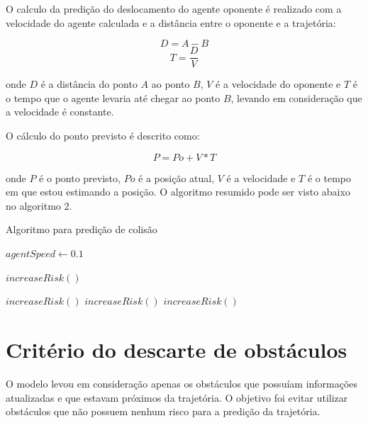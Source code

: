 O calculo da predição do deslocamento do agente oponente é realizado com a velocidade do agente calculada e a distância entre o 
oponente e a trajetória:

\begin{equation}
D = A - B 
\end{equation}
\begin{equation}
T = \frac {D} {V}
\end{equation}

onde $D$ é a distância do ponto $A$ ao ponto $B$, $V$ é a velocidade do oponente e $T$ é o tempo que o agente
levaria até chegar ao ponto $B$, levando em consideração que a velocidade é constante.

O cálculo do ponto previsto é descrito como:

\begin{equation}
  P = Po + V * T 
\end{equation}

onde $P$ é o ponto previsto, $Po$ é a posição atual, $V$ é a velocidade e $T$ é o tempo em que estou estimando a posição. O 
algoritmo resumido pode ser visto abaixo no algoritmo 2.

\begin{algorithm}[!htb]
\label{alg:prediction}
\caption{Algoritmo para predição de colisão}
\begin{algorithmic}[3.2]
    \State \Return
  \EndIf
  
  
    \State $agentSpeed \gets 0.1$
  \EndIf
  
  
  
      \State $increaseRisk()$
    \EndIf
    
    
      \State $increaseRisk()$
      \State $increaseRisk()$
    \Else
      \State $increaseRisk()$
    \EndIf
    
  \EndIf
\EndFunction
\end{algorithmic}
\end{algorithm}

\section{Critério do descarte de obstáculos}
\label{sec:descarte}
O modelo levou em consideração apenas os obstáculos que possuíam informações atualizadas e que estavam próximos da trajetória. O 
objetivo foi evitar utilizar obstáculos que não possuem nenhum risco para a predição da trajetória.

    
